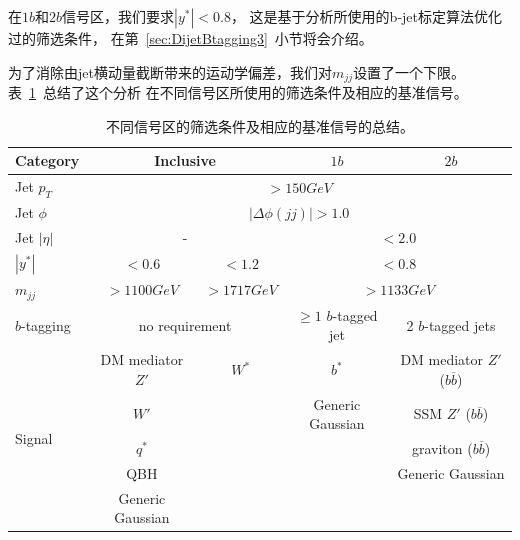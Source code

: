 在$1b$和$2b$信号区，我们要求$|y^*|<0.8$，
这是基于分析所使用的b-jet标定算法优化过的筛选条件，
在第~\ref{sec:DijetBtagging3}~小节将会介绍。

为了消除由jet横动量截断带来的运动学偏差，我们对$m_{jj}$设置了一个下限。
表~\ref{tab:selection}~总结了这个分析
在不同信号区所使用的筛选条件及相应的基准信号。

\begin{table}[htbp]
  \caption{ 
  不同信号区的筛选条件及相应的基准信号的总结。
  }
  \centering
  \begin{tabular}{l|c|c|c|c}
    \hline\hline
    Category & \multicolumn{2}{c|}{Inclusive} & $1b$ & $2b$ \\\hline
    Jet $p_{T}$ & \multicolumn{4}{c}{$>150 GeV$} \\\hline
    Jet $\phi$ & \multicolumn{4}{c}{$|\Delta \phi(jj)|>1.0$} \\\hline
    Jet $|\eta|$& \multicolumn{2}{c|}{-} &  \multicolumn{2}{c}{$<2.0 $} \\\hline
    $|y^*|$ & $<0.6$ &  $<1.2$ &  \multicolumn{2}{c}{$<0.8$} \\\hline
    $m_{jj}$ & $>1100 GeV$ & $>1717 GeV$ & \multicolumn{2}{c}{$>1133 GeV$} \\\hline
    $b$-tagging & \multicolumn{2}{c|}{no requirement} & $\geqslant1$ $b$-tagged jet & 2 $b$-tagged jets \\\hline
    \multirow{5}{*}{Signal} & DM mediator $Z'$ & $W^*$ & $b^*$ & DM mediator $Z'$ ($b\overline{b}$) \\
    &$W'$ & & Generic Gaussian & SSM $Z'$ ($b\overline{b}$) \\
    & $q^*$  & &                 & graviton ($b\overline{b}$) \\
    & QBH    & &                 & Generic Gaussian \\
    & Generic Gaussian & &  & \\\hline
    \hline
  \end{tabular}
  \label{tab:selection}
\end{table}



